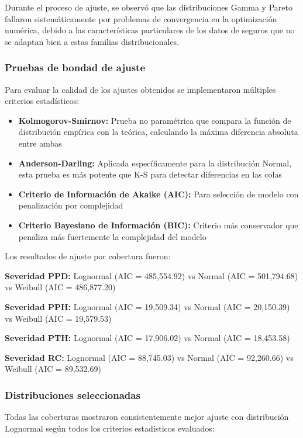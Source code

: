 Durante el proceso de ajuste, se observó que las distribuciones Gamma y Pareto fallaron sistemáticamente por problemas de convergencia en la optimización numérica, debido a las características particulares de los datos de seguros que no se adaptan bien a estas familias distribucionales.

\subsubsection{Pruebas de bondad de ajuste}

Para evaluar la calidad de los ajustes obtenidos se implementaron múltiples criterios estadísticos:

\begin{itemize}
    \item \textbf{Kolmogorov-Smirnov:} Prueba no paramétrica que compara la función de distribución empírica con la teórica, calculando la máxima diferencia absoluta entre ambas
    \item \textbf{Anderson-Darling:} Aplicada específicamente para la distribución Normal, esta prueba es más potente que K-S para detectar diferencias en las colas
    \item \textbf{Criterio de Información de Akaike (AIC):} Para selección de modelo con penalización por complejidad
    \item \textbf{Criterio Bayesiano de Información (BIC):} Criterio más conservador que penaliza más fuertemente la complejidad del modelo
\end{itemize}

Los resultados de ajuste por cobertura fueron:

\textbf{Severidad PPD:} Lognormal (AIC = 485,554.92) vs Normal (AIC = 501,794.68) vs Weibull (AIC = 486,877.20)

\textbf{Severidad PPH:} Lognormal (AIC = 19,509.34) vs Normal (AIC = 20,150.39) vs Weibull (AIC = 19,579.53)

\textbf{Severidad PTH:} Lognormal (AIC = 17,906.02) vs Normal (AIC = 18,453.58)

\textbf{Severidad RC:} Lognormal (AIC = 88,745.03) vs Normal (AIC = 92,260.66) vs Weibull (AIC = 89,532.69)

\subsubsection{Distribuciones seleccionadas}

Todas las coberturas mostraron consistentemente mejor ajuste con distribución Lognormal según todos los criterios estadísticos evaluados:

